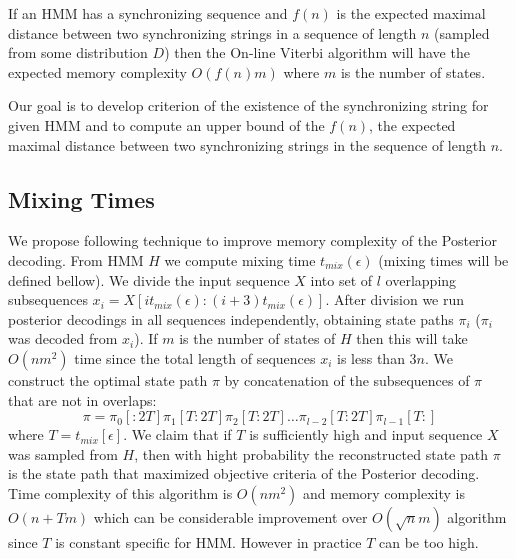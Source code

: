 If an HMM has a synchronizing sequence and $f(n)$ is the expected maximal distance
between two synchronizing strings in a sequence of length $n$ (sampled from
some distribution $D$) then the On-line Viterbi algorithm will have the expected memory
complexity $O(f(n)m)$ where $m$ is the number of states.

Our goal is to develop criterion of the existence of the synchronizing string
for given HMM and to compute an upper bound of the $f(n)$, the expected maximal
distance between two synchronizing strings in the sequence of length $n$.


\subsection{Mixing Times}

\def\tmix{t_{mix}(\epsilon)}
We propose following technique to improve memory complexity of the
Posterior decoding.  From HMM $H$ we compute mixing time
$t_{mix}(\epsilon)$ (mixing times will be defined bellow).  We divide the input
sequence $X$ into set of $l$ overlapping subsequences
$x_i=X[it_{mix}(\epsilon):(i+3)t_{mix}(\epsilon)]$.
After division we run posterior decodings in all sequences independently,
obtaining state paths $\pi_i$ ($\pi_i$ was decoded from $x_i$). If $m$ is the
number of states of $H$ then this will take $O(nm^2)$ time since the total
length of sequences $x_i$ is less than $3n$.  We construct the optimal state
path $\pi$ by concatenation of the subsequences of $\pi$ that are not in
overlaps: \[\pi = \pi_0[:2T] \pi_1[T:2T] \pi_2[T:2T] \dots
\pi_{l-2}[T:2T] \pi_{l-1}[T:]\] where $T=t_{mix}[\epsilon]$. We claim that
if $T$ is sufficiently high and input sequence $X$ was sampled from $H$, then
with hight probability the reconstructed state path $\pi$ is the state path that
maximized objective criteria of the Posterior decoding.  Time complexity of this
algorithm is $O(nm^2)$ and memory complexity is $O(n+Tm)$ which can be
considerable improvement over $O(\sqrt n m)$ algorithm since $T$ is constant
specific for HMM. However in practice $T$ can be too high.

